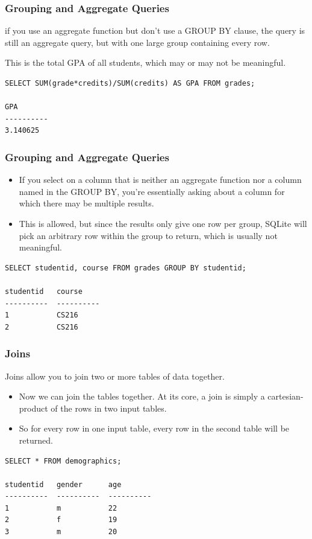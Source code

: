 \begin{frame}[fragile] \frametitle{Grouping and Aggregate Queries}
 if you use an aggregate function but don't use a GROUP BY clause, the query is still an aggregate query, but with one large group containing every row.

This is the total GPA of all students, which may or may not be meaningful.
\begin{lstlisting}
SELECT SUM(grade*credits)/SUM(credits) AS GPA FROM grades; 

GPA       
----------
3.140625  
\end{lstlisting}
\end{frame}

\begin{frame}[fragile] \frametitle{Grouping and Aggregate Queries}
\begin{itemize}
\item  If you select on a column that is neither an aggregate function nor a column named in the GROUP BY, you're essentially asking about a column for which there may be multiple results. \item This is allowed, but since the results only give one row per group, SQLite will pick an arbitrary row within the group to return, which is usually not meaningful.
\end{itemize}
\begin{lstlisting}
SELECT studentid, course FROM grades GROUP BY studentid;

studentid   course    
----------  ----------
1           CS216     
2           CS216   
\end{lstlisting}
\end{frame}

\begin{frame}[fragile] \frametitle{Joins}
Joins allow you to join two or more tables of data together.
\begin{itemize}
\item  Now we can join the tables together. At its core, a join is simply a cartesian-product of the rows in two input tables.
\item  So for every row in one input table, every row in the second table will be returned.
\end{itemize}
\begin{lstlisting}
SELECT * FROM demographics;

studentid   gender      age
----------  ----------  ----------
1           m           22
2           f           19
3           m           20
\end{lstlisting}
\end{frame}

